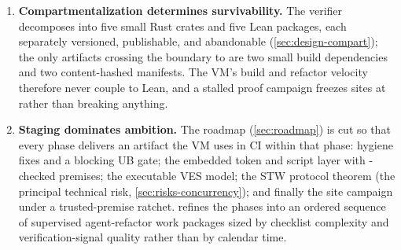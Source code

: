 \begin{enumerate}[leftmargin=1.6em]
  (executable specifications, differential testing against the
  existing 486-fixture oracle, elaborator metaprogramming for the DSL,
  the largest automation and agent-tooling ecosystem); Rocq holds the
  foundational Rust-semantics results (Iris, RustBelt, Tree Borrows,
  RefinedRust). The recommended design states Rust-substrate
  obligations against a small, Miri-falsifiable axiomatization in
  Lean and retains RefinedRust-in-Rocq as an upgrade path for a small
  set of critical modules (\cref{sec:design-embed}).
\item \textbf{Compartmentalization determines survivability.} The
  verifier decomposes into five small Rust crates and five Lean
  packages, each separately versioned, publishable, and abandonable
  (\cref{sec:design-compart}); the only artifacts crossing the
  boundary to \dotnetrs{} are two small build dependencies and two
  content-hashed manifests. The VM's build and refactor velocity
  therefore never couple to Lean, and a stalled proof campaign
  freezes sites at  rather than breaking anything.
\item \textbf{Staging dominates ambition.} The roadmap
  (\cref{sec:roadmap}) is cut so that every phase delivers an
  artifact the VM uses in CI within that phase: hygiene fixes and a
  blocking UB gate; the embedded token and script layer with
  -checked premises; the executable VES model; the STW
  protocol theorem (the principal technical risk,
  \cref{sec:risks-concurrency}); and finally the site campaign under
  a trusted-premise ratchet.  refines the
  phases into an ordered sequence of supervised agent-refactor work
  packages sized by checklist complexity and verification-signal
  quality rather than by calendar time.
\end{enumerate}
